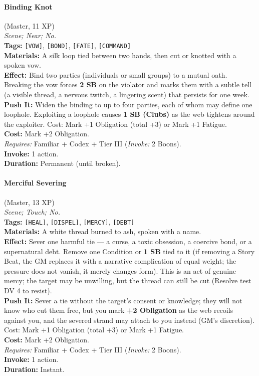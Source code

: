 \paragraph{Binding Knot} (Master, 11 XP) \hfill \\
\emph{Scene; Near; No.} \\
\textbf{Tags:} \texttt{[VOW]}, \texttt{[BOND]}, \texttt{[FATE]}, \texttt{[COMMAND]} \\
\textbf{Materials:} A silk loop tied between two hands, then cut or knotted with a spoken vow. \\
\textbf{Effect:} Bind two parties (individuals or small groups) to a mutual oath. Breaking the vow forces \textbf{2 SB} on the violator and marks them with a subtle tell (a visible thread, a nervous twitch, a lingering scent) that persists for one week. \\
\textbf{Push It:} Widen the binding to up to four parties, each of whom may define one loophole. Exploiting a loophole causes \textbf{1 SB (Clubs)} as the web tightens around the exploiter. Cost: Mark +1 Obligation (total +3) or Mark +1 Fatigue. \\
\textbf{Cost:} Mark +2 Obligation. \\
\textit{Requires:} Familiar + Codex + Tier III (\textit{Invoke:} 2 Boons). \\
\textbf{Invoke:} 1 action. \\
\textbf{Duration:} Permanent (until broken).

\paragraph{Merciful Severing} (Master, 13 XP) \hfill \\
\emph{Scene; Touch; No.} \\
\textbf{Tags:} \texttt{[HEAL]}, \texttt{[DISPEL]}, \texttt{[MERCY]}, \texttt{[DEBT]} \\
\textbf{Materials:} A white thread burned to ash, spoken with a name. \\
\textbf{Effect:} Sever one harmful tie --- a curse, a toxic obsession, a coercive bond, or a supernatural debt. Remove one Condition or \textbf{1 SB} tied to it (if removing a Story Beat, the GM replaces it with a narrative complication of equal weight; the pressure does not vanish, it merely changes form). This is an act of genuine mercy; the target may be unwilling, but the thread can still be cut (Resolve test DV 4 to resist). \\
\textbf{Push It:} Sever a tie without the target's consent or knowledge; they will not know who cut them free, but you mark \textbf{+2 Obligation} as the web recoils against you, and the severed strand may attach to you instead (GM's discretion). Cost: Mark +1 Obligation (total +3) or Mark +1 Fatigue. \\
\textbf{Cost:} Mark +2 Obligation. \\
\textit{Requires:} Familiar + Codex + Tier III (\textit{Invoke:} 2 Boons). \\
\textbf{Invoke:} 1 action. \\
\textbf{Duration:} Instant.

